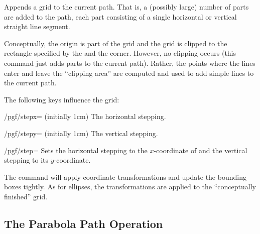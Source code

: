 \begin{command}{\pgfpathgrid{}}
  Appends a grid to the current path. That is, a (possibly large)
  number of parts are added to the path, each part consisting of a
  single horizontal or vertical straight line segment.

  Conceptually, the origin is part of the grid and the grid is clipped
  to the rectangle specified by the  and
  the  corner. However, no clipping occurs (this
  command just adds parts to the current path). Rather, the points
  where the lines enter and leave the ``clipping area'' are computed
  and used to add simple lines to the current path.

  The following keys influence the grid:
  \begin{key}{/pgf/stepx= (initially 1cm)}
    The horizontal stepping.
  \end{key}
  \begin{key}{/pgf/stepy= (initially 1cm)}
    The vertical stepping.
  \end{key}
  \begin{key}{/pgf/step=}
    Sets the horizontal stepping to the $x$-coordinate of
     and the vertical stepping to its $y$-coordinate.
  \end{key}
\begin{codeexample}[]
\begin{pgfpicture}
  \pgfsetlinewidth{0.8pt}
  \pgfpathgrid[step={\pgfpoint{1cm}{1cm}}]
    {\pgfpoint{-3mm}{-3mm}}{\pgfpoint{33mm}{23mm}}
  \pgfsetlinewidth{0.4pt}
  \pgfpathgrid[stepx=1mm,stepy=1mm]
    {\pgfpoint{-1.5mm}{-1.5mm}}{\pgfpoint{31.5mm}{21.5mm}}
\end{pgfpicture}
\end{codeexample}
  The command will apply coordinate transformations and update the
  bounding boxes tightly. As for ellipses, the transformations are
  applied to the ``conceptually finished'' grid.
\begin{codeexample}[]
\begin{pgfpicture}
  \pgfpathgrid[stepx=1mm,stepy=2mm]{\pgfpoint{0mm}{0mm}}{\pgfpoint{30mm}{30mm}}
\end{pgfpicture}
\end{codeexample}
\end{command}


\subsection{The Parabola Path Operation}

